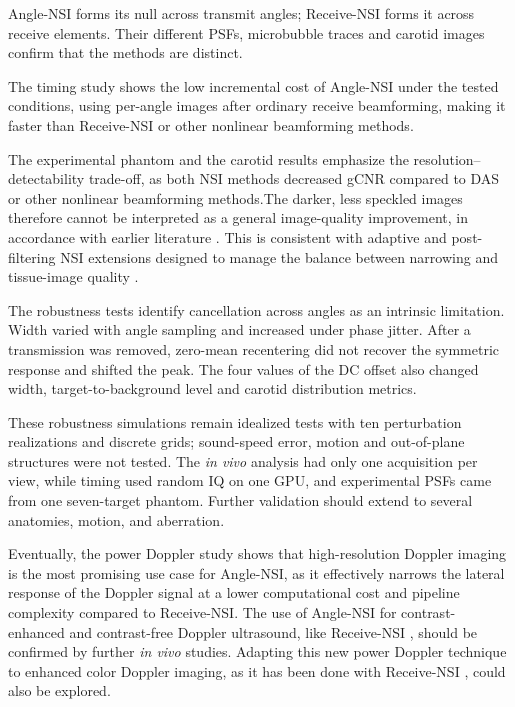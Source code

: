 \documentclass{iopjournal}
\providecommand{\revstart}{}
\providecommand{\revstop}{}
\begin{document}
\revstart Angle-NSI forms its null across transmit angles; Receive-NSI forms it across receive elements. Their different PSFs, microbubble traces and carotid images confirm that the methods are distinct. \revstop

\revstart The timing study shows the low incremental cost of Angle-NSI under the tested conditions, using per-angle images after ordinary receive beamforming, making it faster than Receive-NSI or other nonlinear beamforming methods. \revstop

The experimental phantom and the carotid results emphasize the resolution--detectability trade-off, \revstart as both NSI
methods decreased gCNR compared to DAS or other nonlinear beamforming methods.\revstop The darker, less speckled images therefore cannot be
interpreted as a general \revstart image-quality \revstop improvement, in accordance with earlier
literature \citep{agarwal2019improving}. This is consistent
with adaptive and post-filtering NSI extensions designed to manage the balance
between narrowing and tissue-image quality
\citep{xu2026regionadaptive,yang2026generalized}. 

The robustness tests identify cancellation across angles as an intrinsic
limitation. Width varied with angle sampling and increased
under phase jitter. After a transmission was removed, zero-mean recentering did
not recover the symmetric response and shifted the peak. \revstart The four
values of the DC offset also changed width, target-to-background level and carotid
distribution metrics.\revstop 

These robustness simulations remain idealized tests with ten perturbation
realizations and discrete grids; sound-speed error, motion and out-of-plane
structures were not tested. The \textit{in vivo} analysis
had only one acquisition per view, while timing used random IQ on
one GPU, and experimental PSFs came from one seven-target phantom.\revstop{} Further validation should extend to several anatomies, motion, and aberration.

\revstart Eventually, the power Doppler study shows that high-resolution Doppler imaging is the most promising use case for Angle-NSI, as it effectively narrows the lateral response of the Doppler signal at a lower computational cost and pipeline complexity compared to Receive-NSI. The use of Angle-NSI for contrast-enhanced and contrast-free Doppler ultrasound, like Receive-NSI \citep{kou2024highresolution}, should be confirmed by further \textit{in vivo} studies. Adapting this new power Doppler technique to enhanced color Doppler imaging, as it has been done with  Receive-NSI \citep{kou_label-free_2025}, could also be explored. \revstop
\end{document}
